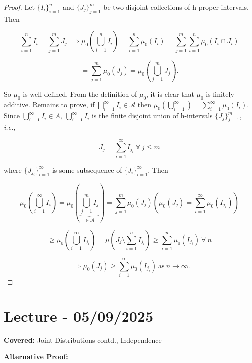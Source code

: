 \documentclass{functionspaces}
\begin{document}
\begin{proof}
Let $\{I_{i}\}_{i=1}^{n}$ and $\{J_{j}\}_{j=1}^{m}$ be two disjoint collections of h-proper intervals. Then

\[
\sum_{i=1}^{n} I_{i} = \sum_{j=1}^{m} J_{j} \implies \mu_{0}\left(\bigcup_{i=1}^{n} I_{i}\right) = \sum_{i=1}^{n} \mu_{0}(I_{i}) = \sum_{j=1}^{m} \sum_{i=1}^{n} \mu_{0}(I_{i} \cap J_{i})
\]

\[
= \sum_{j=1}^{m} \mu_{0}(J_{j}) = \mu_{0}\left(\bigcup_{j=1}^{m} J_{j}\right).
\]

So $\mu_{0}$ is well-defined. From the definition of $\mu_{0}$, it is clear that $\mu_{0}$ is finitely additive. Remains to prove, if $\bigsqcup_{i=1}^{\infty} I_{i} \in \mathcal{A}$ then $\mu_{0}(\bigcup_{i=1}^{\infty}) = \sum_{i=1}^{\infty} \mu_{0}(I_{i}).$ Since $\bigcup_{i=1}^{\infty} I_{i} \in A,\ \bigcup_{i=1}^{\infty} I_{i}$ is the finite disjoint union of h-intervals $\{J_{j}\}_{j=1}^{m}$, \textit{i.e.},

\[
J_{j} = \sum_{i=1}^{\infty} I_{j_{i}}\ \forall\ j \leq m
\]

where $\{J_{j_{i}}\}_{i=1}^{\infty}$ is some subsequence of $\{J_{i}\}_{i=1}^{\infty}$. Then

\[
\mu_{0}\left(\bigcup_{i=1}^{\infty} I_{i}\right) = \mu_{0}\left(\underbrace{\bigcup_{j=1}^{m} I_{j}}_{\in \mathcal{A}}\right) = \sum_{j=1}^{m} \mu_{0}(J_{j}) \left(\mu_{0}(J_{j}) = \sum_{i=1}^{\infty} \mu_{0}(I_{j_{i}})\right)
\]

\[
\geq \mu_{0}\left(\bigcup_{i=1}^{\infty} I_{j_{i}}\right) = \mu\left(J_{j} \setminus \sum_{i=1}^{n} I_{j_{i}}\right) \geq \sum_{i=1}^{n} \mu_{0}(I_{j_{i}})\ \forall\ n
\]

\[
\implies \mu_{0}(J_{j}) \geq \sum_{i=1}^{\infty} \mu_{0}(I_{j_{i}})\ \text{as}\ n \to \infty.
\]
\end{proof}

\endgroup

\newpage
\section{Lecture - 05/09/2025}

\textbf{Covered:} Joint Distributions contd., Independence

\begingroup
\setlength{\parskip}{6pt}
\setlength{\parindent}{0pt}

\textbf{Alternative Proof:}
\end{document}
